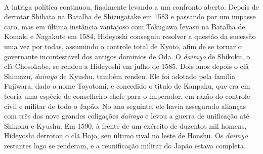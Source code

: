 \documentclass[12pt, a4paper]{article}
\begin{document}
            \\
            \indent A intriga política continuou, finalmente levando a um confronto aberto. Depois de derrotar Shibata na Batalha de Shizugatake em 1583 e passando por um impasse caro, mas em última instância vantajoso com Tokugawa Ieyasu na Batalha de Komaki e Nagakute em 1584, Hideyoshi conseguiu resolver a questão da sucessão uma vez por todas, assumindo o controle total de Kyoto, afim de se tornar o governante incontestável dos antigos dominios de Oda. O \textit{daimyo} de Shikoku, o clã Chosokabe, se rendeu a Hideyoshi em julho de 1585. Dois anos depois o clã Shimazu, \textit{daimyo} de Kyushu, também rendeu. Ele foi adotado pela família Fujiwara, dado o nome Toyotomi, e concedido o titulo de Kanpaku, que era em teoria uma espécie de conselheiro-chefe para o imperador, em razão do controle civil e militar de todo o Japão. No ano seguinte, ele havia assegurado alianças com três das nove grandes coligações \textit{daimyo} e levou a guerra de unificação até Shikoku e Kyushu. Em 1590, à frente de um exército de duzentos mil homens, Hideyoshi derrotou o clã Hojo, seu último rival no leste de Honshu. Os \textit{daimyo} restantes logo se renderam, e a reunificação militar do Japão estava completa.\\
            
\end{document}
